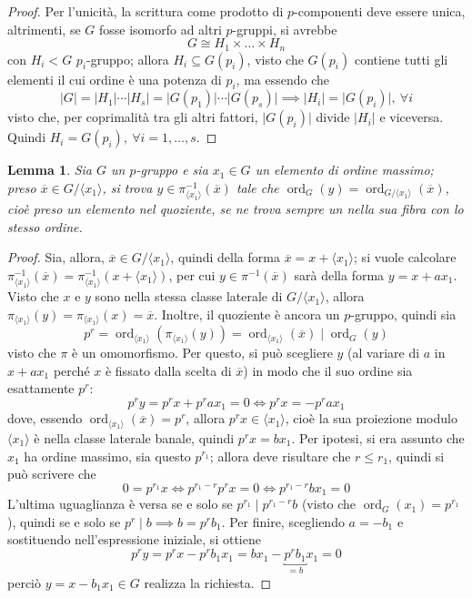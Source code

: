 \documentclass[12pt]{scrartcl}
\theoremstyle{style}
\newtheorem{lemma}{Lemma}[teorema]
\numberwithin{equation}{subsection}
\begin{document}
\begin{proof}
		Per l'unicit\`a, la scrittura come prodotto di $p$-componenti deve essere unica, altrimenti, se $G$ fosse isomorfo ad altri $p$-gruppi, si avrebbe
		\[
		G \cong H_1\times \ldots\times H_n
		\] 
		con $H_i<G$ $p_i$-gruppo; allora $H_i \subseteq G(p_i)$, visto che $G(p_i)$ contiene tutti gli elementi il cui ordine \`e una potenza di $p_i$, ma essendo che
		\[
		\lvert G \rvert =\lvert H_1 \rvert \cdots \lvert H_s \rvert = \lvert G(p_1) \rvert \cdots\lvert G(p_s) \rvert \implies \lvert H_i \rvert =\lvert G(p_i) \rvert , \ \forall i
		\] 
		visto che, per coprimalit\`a tra gli altri fattori, $\lvert G(p_i) \rvert  $ divide $ \lvert H_i \rvert $ e viceversa. Quindi $H_i = G(p_i), \ \forall i = 1,\ldots,s$.
\end{proof}
\begin{lemma}
	Sia $G$ un $p$-gruppo e sia $x_1\in G$ un elemento di ordine massimo; preso $\overline{x} \in G / \langle x_1 \rangle$, si trova $y \in \pi^{-1}_{\langle x_1 \rangle} (\overline{x})$ tale che $\operatorname{ord}_G(y)= \operatorname{ord}_{G/\langle x_1 \rangle} ( \overline{x})  $, cio\`e preso un elemento nel quoziente, se ne trova sempre un nella sua fibra con lo stesso ordine.
\end{lemma}
	\begin{proof}
		Sia, allora, $\overline{x}\in G / \langle x_1 \rangle$, quindi della forma $\overline{x}= x + \langle x_1 \rangle$; si vuole calcolare $\pi^{-1}_{\langle x_1 \rangle} (\overline{x}) = \pi^{-1}_{\langle x_1 \rangle} (x+\langle x_1 \rangle)$, per cui $y  \in \pi^{-1}(\overline{x})$ sar\`a della forma $y = x + ax_1$.
		Visto che $x$ e $y$ sono nella stessa classe laterale di $G / \langle x_1 \rangle$, allora $\pi_{\langle x_1 \rangle} (y) = \pi_{\langle x_1 \rangle} (x)= \overline{x}$.
		Inoltre, il quoziente \`e ancora un $p$-gruppo, quindi sia
		\[
		p^r = \operatorname{ord}_{\langle x_1 \rangle} (\pi_{\langle x_1 \rangle} (y)) =\operatorname{ord}_{\langle x_1 \rangle} (\overline{x})  \mid \operatorname{ord}_G(y) 
		\] 
		visto che $\pi$ \`e un omomorfismo.
		Per questo, si pu\`o scegliere $y$ (al variare di $a$ in $x+ ax_1$ perch\'e $x$ \`e fissato dalla scelta di $\overline{x}$) in modo che il suo ordine sia esattamente $p^r$:
		\[
		p^r y = p^r x + p^r ax_1 = 0 \iff p^r x = - p^r ax_1
		\] 
		dove, essendo $\operatorname{ord}_{\langle x_1 \rangle} (\overline{x}) =p^r$, allora $p^r x \in \langle x_1 \rangle$, cio\`e la sua proiezione modulo $\langle x_1 \rangle$ \`e nella classe laterale banale, quindi $p^rx = bx_1$.
		Per ipotesi, si era assunto che $x_1$ ha ordine massimo, sia questo $p^{r_1} $; allora deve risultare che $r\le r_1$, quindi si pu\`o scrivere che
		\[
		0 = p^{r_1} x \iff p^{r_1-r} p^r x = 0 \iff p^{r_1-r} bx_1=0
		\] 
		L'ultima uguaglianza \`e versa se e solo se $p^{r_1}  \mid p^{r_1-r} b$ (visto che $\operatorname{ord}_G(x_1) =p^{r_1} $), quindi se e solo se $p^r  \mid b \implies b = p^r b_1$.
		Per finire, scegliendo $a = -b_1$  e sostituendo nell'espressione iniziale, si ottiene 
		\[
			p^r y = p^r x - p^r b_1x_1=bx_1 - \underbracket{p^r b_1}_{=b}  x_1 = 0
		\] 
		perci\`o $y= x - b_1 x_1 \in G$ realizza la richiesta.
	\end{proof}
\end{document}
